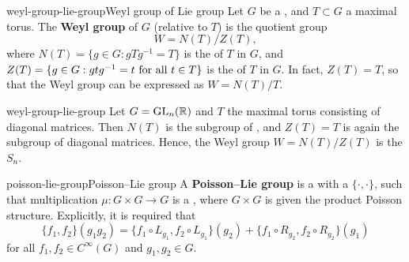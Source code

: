 \begin{topic}{weyl-group-lie-group}{Weyl group of Lie group}
    Let $G$ be a   , and $T \subset G$ a maximal torus. The \textbf{Weyl group} of $G$ (relative to $T$) is the quotient group
    \[ W = N(T) / Z(T) , \]
    where $N(T) = \{ g \in G : gTg^{-1} = T \}$ is the  of $T$ in $G$, and $Z(T) = \{ g \in G : gtg^{-1} = t \textup{ for all } t \in T \}$ is the  of $T$ in $G$. In fact, $Z(T) = T$, so that the Weyl group can be expressed as $W = N(T) / T$.
\end{topic}

\begin{example}{weyl-group-lie-group}
    Let $G = \textup{GL}_n(\mathbb{R})$ and $T$ the maximal torus consisting of diagonal matrices. Then $N(T)$ is the subgroup of , and $Z(T) = T$ is again the subgroup of diagonal matrices. Hence, the Weyl group $W = N(T)/Z(T)$ is the  $S_n$.
\end{example}

\begin{topic}{poisson-lie-group}{Poisson--Lie group}
    A \textbf{Poisson--Lie group} is a  with a  $\{ \cdot, \cdot \}$, such that multiplication $\mu : G \times G \to G$ is a , where $G \times G$ is given the product Poisson structure. Explicitly, it is required that
    \[ \{ f_1, f_2 \}(g_1 g_2) = \{ f_1 \circ L_{g_1}, f_2 \circ L_{g_1} \}(g_2) + \{ f_1 \circ R_{g_2}, f_2 \circ R_{g_2} \}(g_1) \]
    for all $f_1, f_2 \in C^\infty(G)$ and $g_1, g_2 \in G$.
\end{topic}

